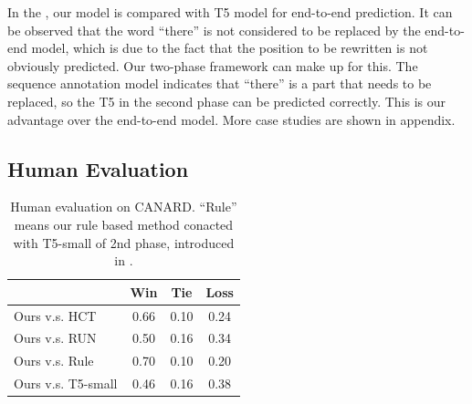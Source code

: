 \begin{table}[h]
\centering
\scriptsize
{}
\caption{A typical example extracted from the prediction results on CANARD.}
\label{tab:case-study-1}
\end{table}

In the , our model is compared with T5 model for end-to-end prediction. It can be observed that the word ``there'' is not considered to be replaced by the end-to-end model, which is due to the fact that the position to be rewritten is not obviously predicted. Our two-phase framework can make up for this. The sequence annotation model indicates that ``there'' is a part that needs to be replaced, so the T5 in the second phase can be predicted correctly. This is our advantage over the end-to-end model. More case studies are shown in appendix.

\subsection{Human Evaluation}

\begin{table}[h]
\centering
\scriptsize
\begin{tabular}{lccc}
\toprule
 &    \textbf{Win} & \textbf{Tie} & \textbf{Loss} \\ \midrule
Ours v.s. HCT    & 0.66 & 0.10 & 0.24 \\
Ours v.s. RUN & 0.50 & 0.16 & 0.34 \\
Ours v.s. Rule  & 0.70 & 0.10 & 0.20 \\
Ours v.s. T5-small   & 0.46 & 0.16 & 0.38\\
\bottomrule
\end{tabular}
\caption{Human evaluation on CANARD. ``Rule'' means our rule based method conacted with T5-small of 2nd phase, introduced in .}
\label{tab:human-eval}
\end{table}

